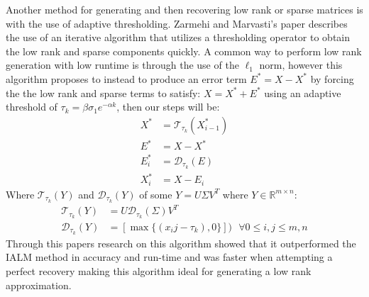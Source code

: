 \documentclass[12pt]{article}
\newcommand{\R}{\mathbb{R}}
\begin{document}
Another method for generating and then recovering low rank or sparse matrices is with the use of adaptive thresholding. Zarmehi and Marvasti's paper describes the use of an iterative algorithm that utilizes a thresholding operator to obtain the low rank and sparse components quickly. A common way to perform low rank generation with low runtime is through the use of the $\ell_1$ norm, however this algorithm proposes to instead to produce an error term $E^* = X-X^*$ by forcing the the low rank and sparse terms to satisfy: $X = X^*+E^*$ using an adaptive threshold of $\tau_k = \beta \sigma_1 e^{-\alpha k}$, then our steps will be:
\begin{align*}
X^* &= \mathcal{T}_{\tau_k}(X^*_{i-1})\\
E^* &= X - X^* \\
E_i^* &= \mathcal{D}_{\tau_k}(E) \\
X^*_i &= X - E_i
\end{align*}
Where $\mathcal{T}_{\tau_k}(Y)$ and $\mathcal{D}_{\tau_k}(Y)$ of some $Y = U\Sigma V^T$ where $Y \in \R^{m \times n}$:
\begin{align*}
\mathcal{T}_{\tau_k}(Y) &= U \mathcal{D}_{\tau_k}(\Sigma) V^T\\
\mathcal{D}_{\tau_k}(Y) &= [\max\{ (x_ij - \tau_k),0 \}]) \text{ } \forall 0 \le i,j \le m,n
\end{align*}
Through this papers research on this algorithm showed that it outperformed the IALM method in accuracy and run-time and was faster when attempting a perfect recovery making this algorithm ideal for generating a low rank approximation.\\
\end{document}
